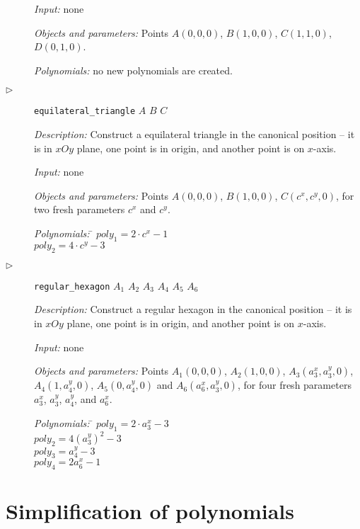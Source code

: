 \documentclass[final,1p,times,authoryear]{elsarticle}
\begin{document}
\begin{description}
  {\em Input:} none

  {\em Objects and parameters:} Points $A(0, 0, 0)$, $B(1, 0, 0)$,
  $C(1, 1, 0)$, $D(0, 1, 0)$.

\begin{tabbing}
{\em Polynomials:} no new polynomials are created.
\end{tabbing}


\item[$\triangleright$] {\tt equilateral\_triangle} $A$ $B$ $C$

  {\em Description:} Construct a equilateral triangle in the canonical
  position -- it is in $xOy$ plane, one point is in origin, and
  another point is on $x$-axis.
  
  {\em Input:} none

  {\em Objects and parameters:} Points $A(0, 0, 0)$, $B(1, 0, 0)$,
  $C(c^x, c^y, 0)$, for two fresh parameters $c^x$ and $c^y$.

\begin{tabbing}
{\em Polynomials:} \= $poly_1 = 2\cdot c^x - 1$ \\
                   \> $poly_2 = 4\cdot c^y - 3$
\end{tabbing}


\item[$\triangleright$] {\tt regular\_hexagon} $A_1$ $A_2$ $A_3$ $A_4$ $A_5$ $A_6$

  {\em Description:} Construct a regular hexagon in the canonical
  position -- it is in $xOy$ plane, one point is in origin, and
  another point is on $x$-axis. 
  
  {\em Input:} none

  {\em Objects and parameters:} Points $A_1(0, 0, 0)$, $A_2(1, 0, 0)$,
  $A_3(a_3^x, a_3^y, 0)$, $A_4(1, a_4^y, 0)$, $A_5(0, a_4^y, 0)$ and
  $A_6(a_6^x, a_3^y, 0)$, for four fresh parameters $a_3^x$, $a_3^y$,
  $a_4^y$, and $a_6^x$.

\begin{tabbing}
{\em Polynomials:} \= $poly_1 = 2\cdot a_3^x - 3$ \\
                   \> $poly_2 = 4(a_3^y)^2 - 3$ \\
                   \> $poly_3 = a_4^y - 3$ \\
                   \> $poly_4 = 2a_6^x - 1$
\end{tabbing}
\end{description}


\section{Simplification of polynomials}
\label{simplification}
\end{document}
